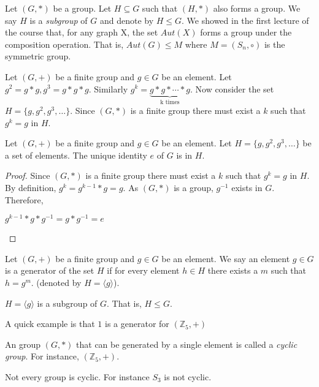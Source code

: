 Let $(G,*)$ be a group. Let $H\subseteq G$ such that $(H,*)$ also forms a group. We say $H$ is a {\em subgroup} of $G$ and denote by $H\leq G$. We showed in the first lecture of the course that, for any graph X, the set $Aut(X)$ forms a group under the composition operation. That is, $Aut(G)\leq M$ where $M=(S_n,\circ)$ is the symmetric group.

Let $(G,+)$ be a finite group and $g\in G$ be an element. Let $g^2 =  g*g ,g^3 =  g*g*g $. Similarly $g^k = \underbrace{g*g*\cdots * g}_\text{k times}$. Now consider the set $H=  \{g,g^2,g^3,\ldots\}$. Since $(G,*)$ is a finite group there must exist a $k$ such that $g^k=g$ in $H$.

\begin{lemma}
Let $(G,+)$ be a finite group and $g\in G$ be an element. Let $H=\{g,g^2,g^3,\ldots\}$ be a set of elements. The unique identity $e$ of $G$ is in $H$.
\end{lemma}
\begin{proof}
Since $(G,*)$ is a finite group there must exist a $k$ such that $g^k=g$ in $H$. By definition, $g^k = g^{k-1}*g = g$. As $(G,*)$ is a group, $g^{-1}$ exists in $G$.\\
Therefore,
\begin{center}
$g^{k-1}*g*g^{-1} = g*g^{-1} = e$ 
\end{center}
\end{proof}

\begin{definition}
Let $(G,+)$ be a finite group and $g\in G$ be an element. We say an element $g\in G$ is a generator of the set $H$ if for every element $h\in H$ there exists a $m$ such that $h=g^m$.  (denoted by $H=\langle g \rangle$).
\end{definition}

\begin{observation}$H = \langle g \rangle$ is a subgroup of $G$. That is, $H\leq G$.
\end{observation}

A quick example is that $1$ is a generator for $(\mathbb{Z}_5,+)$

\begin{definition}
An group $(G,*)$ that can be generated by a single element is called a {\em cyclic group}. For instance, $(\mathbb{Z}_5,+)$.
\end{definition}

Not every group is cyclic. For instance $S_3$ is not cyclic.



